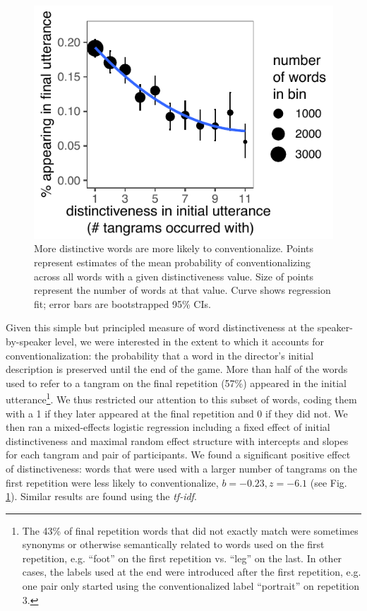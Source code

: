 \documentclass[alpha-refs]{wiley-article}
\begin{document}
\begin{figure}[t!]
\centering
\includegraphics[scale=.85]{distinctiveness.pdf}
\caption{More distinctive words are more likely to conventionalize. Points represent estimates of the mean probability of conventionalizing across all words with a given distinctiveness value. Size of points represent the number of words at that value. Curve shows regression fit; error bars are bootstrapped 95\% CIs.}
\label{fig:distinct}
\end{figure}
%
Given this simple but principled measure of word distinctiveness at the speaker-by-speaker level, we were interested in the extent to which it accounts for conventionalization: the probability that a word in the director's initial description is preserved until the end of the game. 
More than half of the words used to refer to a tangram on the final repetition (57\%) appeared in the initial utterance\footnote{The 43\% of final repetition words that did not exactly match were sometimes synonyms or otherwise semantically related to words used on the first repetition, e.g. ``foot'' on the first repetition vs. ``leg'' on the last. In other cases, the labels used at the end were introduced after the first repetition, e.g. one pair only started using the conventionalized label ``portrait'' on repetition 3.}.
We thus restricted our attention to this subset of words, coding them with a 1 if they later appeared at the final repetition and 0 if they did not.
We then ran a mixed-effects logistic regression including a fixed effect of initial distinctiveness and maximal random effect structure with intercepts and slopes for each tangram and pair of participants.
We found a significant positive effect of distinctiveness: words that were used with a larger number of tangrams on the first repetition were less likely to conventionalize, $b = -0.23, z = -6.1$ (see Fig. \ref{fig:distinct}). 
Similar results are found using the \emph{tf-idf}.
\end{document}
